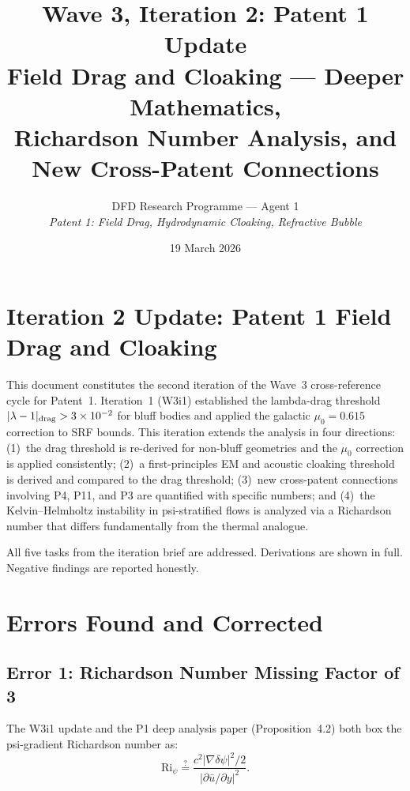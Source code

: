 \documentclass[11pt,twocolumn]{article}
\title{Wave 3, Iteration 2: Patent 1 Update\\
Field Drag and Cloaking --- Deeper Mathematics,\\
Richardson Number Analysis, and New Cross-Patent Connections}
\author{DFD Research Programme --- Agent 1\\
\textit{Patent 1: Field Drag, Hydrodynamic Cloaking, Refractive Bubble}}
\date{19 March 2026}
\newcommand{\dpsi}{\delta\psi}
\newcommand{\lam}{\lambda}
\newcommand{\Ri}{\mathrm{Ri}}
\begin{document}
\maketitle

\section{Iteration 2 Update: Patent 1 Field Drag and Cloaking}

This document constitutes the second iteration of the Wave~3 cross-reference
cycle for Patent~1. Iteration~1 (W3i1) established the lambda-drag threshold
$|\lam-1|_{\rm drag} > 3\times10^{-2}$ for bluff bodies and applied the
galactic $\mu_0 = 0.615$ correction to SRF bounds. This iteration extends
the analysis in four directions: (1)~the drag threshold is re-derived for
non-bluff geometries and the $\mu_0$ correction is applied consistently;
(2)~a first-principles EM and acoustic cloaking threshold is derived and
compared to the drag threshold; (3)~new cross-patent connections involving
P4, P11, and P3 are quantified with specific numbers; and (4)~the
Kelvin--Helmholtz instability in psi-stratified flows is analyzed via a
Richardson number that differs fundamentally from the thermal analogue.

All five tasks from the iteration brief are addressed. Derivations are shown
in full. Negative findings are reported honestly.

\section{Errors Found and Corrected}
\label{sec:errors}

\subsection{Error 1: Richardson Number Missing Factor of 3}

The W3i1 update and the P1 deep analysis paper (Proposition~4.2) both
box the psi-gradient Richardson number as:
\begin{equation}
\Ri_\psi \stackrel{?}{=}
\frac{c^2|\nabla\dpsi|^2/2}{|\partial\bar{u}/\partial y|^2}.
\label{eq:ri_wrong}
\end{equation}
\end{document}
